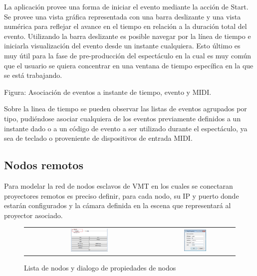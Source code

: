La aplicación provee una forma de iniciar el evento mediante la acción de Start. Se provee una vista gráfica representada con una barra deslizante y una vista numérica para reflejar el avance en el tiempo en relación a la duración total del evento. Utilizando la barra deslizante es posible navegar por la línea de tiempo e iniciarla visualización del evento desde un instante cualquiera. Esto último es muy útil para la fase de pre-producción del espectáculo en la cual es muy común que el usuario se quiera concentrar en una ventana de tiempo específica en la que se está trabajando.


Figura: Asociación de eventos a instante de tiempo, evento y MIDI.

Sobre la linea de tiempo se pueden observar las listas de eventos agrupados por tipo, pudiéndose asociar cualquiera de los eventos previamente definidos a un instante dado o a un código de evento a ser utilizado durante el espectáculo, ya sea de teclado o proveniente de dispositivos de entrada MIDI.

\subsection{Nodos remotos}

Para modelar la red de nodos esclavos de VMT en los cuales se conectaran proyectores remotos es preciso definir, para cada nodo, su IP y puerto donde estarán configurados y la cámara definida en la escena que representará al proyector asociado.

\begin{figure}
	\begin{center}
		\begin{tabular}[c]{cc}
			\includegraphics[width=0.3\textwidth]{./Cap5_vmt/vmt_nodeProperties_1.png}
				&        
			\includegraphics[width=0.3\textwidth]{./Cap5_vmt/vmt_nodeProperties_2.png}
		\end{tabular}
	\end{center}
	\caption{Lista de nodos y dialogo de propiedades de nodos}
	\label{fig:VMT-Nodes}
\end{figure}


